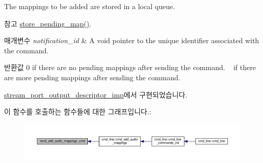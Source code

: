 The mappings to be added are stored in a local queue. \begin{DoxySeeAlso}{참고}
\hyperlink{classavdecc__lib_1_1stream__port__output__descriptor_ac1774e84412c74378819f20d257a7653}{store\+\_\+pending\+\_\+map()}.
\end{DoxySeeAlso}

\begin{DoxyParams}{매개변수}
{\em notification\+\_\+id} & A void pointer to the unique identifier associated with the command.\\
\hline
\end{DoxyParams}
\begin{DoxyReturn}{반환값}
0 if there are no pending mappings after sending the command. ~ if there are more pending mappings after sending the command. 
\end{DoxyReturn}


\hyperlink{classavdecc__lib_1_1stream__port__output__descriptor__imp_a607418ce38a1e4cbb44bd670eb0f398b}{stream\+\_\+port\+\_\+output\+\_\+descriptor\+\_\+imp}에서 구현되었습니다.



이 함수를 호출하는 함수들에 대한 그래프입니다.\+:
\nopagebreak
\begin{figure}[H]
\begin{center}
\leavevmode
\includegraphics[width=350pt]{classavdecc__lib_1_1stream__port__output__descriptor_a5d94b5190eaba5a650afd90d6e483d72_icgraph}
\end{center}
\end{figure}



